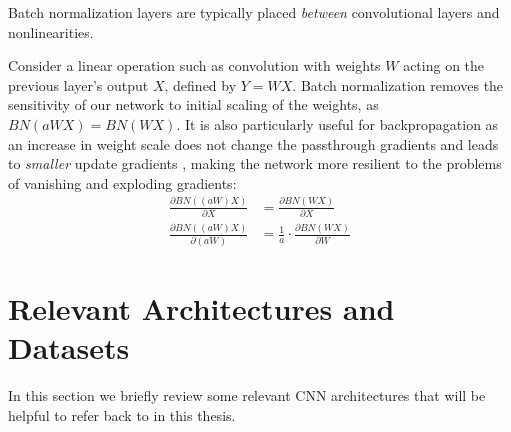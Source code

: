 Batch normalization layers are typically placed \emph{between} convolutional layers
and nonlinearities.

Consider a linear operation such as convolution with weights $W$ acting on the
previous layer's output $X$, defined by $Y = WX$.
Batch normalization
removes the sensitivity of our network to
initial scaling of the weights, as
$BN(aWX) = BN(WX)$.
It is also particularly useful for backpropagation as an increase in weight
scale does not change the passthrough gradients and leads to \emph{smaller}
update gradients \cite{ioffe_batch_2015}, making the network more resilient to
the problems of vanishing and exploding gradients:
\begin{align}
  \frac{\partial BN((aW)X)}{\partial X} & =  \frac{\partial
  BN(WX)}{\partial X} \nonumber\\
  \frac{\partial BN((aW)X)}{\partial (aW)} & =  \frac{1}{a} \cdot \frac{\partial
  BN(WX)}{\partial W}
\end{align}

\section{Relevant Architectures and Datasets}
In this section we briefly review some relevant CNN architectures that will be
helpful to refer back to in this thesis.

